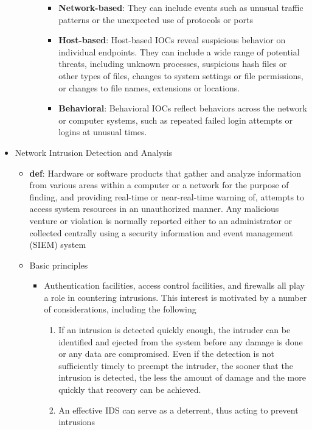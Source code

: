 \documentclass{article}
\begin{document}
\begin{itemize}
\begin{itemize}
\begin{itemize}
            \begin{itemize}
                \item \textbf{Network-based}: They can include events such as unusual traffic patterns or the unexpected use of protocols or ports
                \item \textbf{Host-based}: Host-based IOCs reveal suspicious behavior on individual endpoints. They can include a wide range of potential threats, including unknown processes, suspicious hash files or other types of files, changes to system settings or file permissions, or changes to file names, extensions or locations.
                \item \textbf{Behavioral}: Behavioral IOCs reflect behaviors across the network or computer systems, such as repeated failed login attempts or logins at unusual times.
            \end{itemize}
        \end{itemize}
    \end{itemize}
    \item Network Intrusion Detection and Analysis
    \begin{itemize}
        \item \textbf{def}: Hardware or software products that gather and analyze information from various areas within a computer or a network for the purpose of finding, and providing real-time or near-real-time warning of, attempts to access system resources in an unauthorized manner. Any malicious venture or violation is normally reported either to an administrator or collected centrally using a security information and event management (SIEM) system
        \item Basic principles
        \begin{itemize}
            \item Authentication facilities, access control facilities, and firewalls all play a role in countering intrusions. This interest is motivated by a number of considerations, including the following
            \begin{enumerate}
                \item If an intrusion is detected quickly enough, the intruder can be identified and ejected from the system before any damage is done or any data are compromised. Even if the detection is not sufficiently timely to preempt the intruder, the sooner that the intrusion is detected, the less the amount of damage and the more quickly that recovery can be achieved.
                \item An effective IDS can serve as a deterrent, thus acting to prevent intrusions

\end{enumerate}
\end{itemize}
\end{itemize}
\end{itemize}
\end{document}
